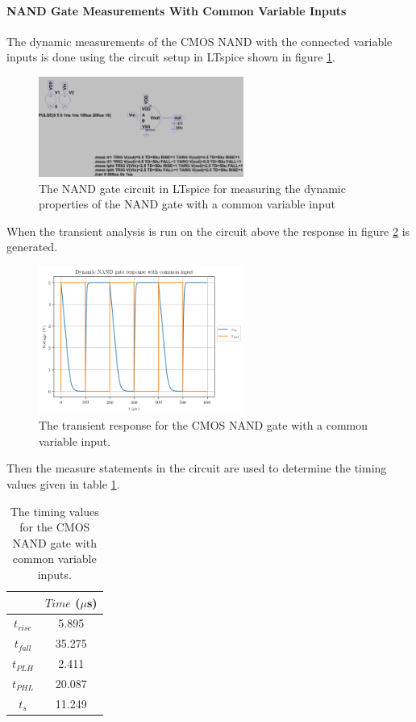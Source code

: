 \documentclass[titlepage, 12pt]{article}
\begin{document}
    \paragraph{NAND Gate Measurements With Common Variable Inputs}

    The dynamic measurements of the CMOS NAND with the connected
    variable inputs is done using the circuit setup in LTspice shown
    in figure \ref{fig:part_22_NAND_AB_circuit}.
    \begin{figure}[H]
        \centering
        \includegraphics[width=0.6\textwidth]
        {figures/part_22_NAND_AB_circuit.png}
        \caption{The NAND gate circuit in LTspice for measuring the
            dynamic properties of the NAND gate with a common variable
        input}
        \label{fig:part_22_NAND_AB_circuit}
    \end{figure}
    When the transient analysis is run on the circuit above the response
    in figure \ref{fig:part_22_NAND_AB} is generated.
    \begin{figure}[H]
        \centering
        \includegraphics[width=0.6\textwidth]{figures/part_22_NAND_AB.png}
        \caption{The transient response for the CMOS NAND gate with a
        common variable input.}
        \label{fig:part_22_NAND_AB}
    \end{figure}
    Then the measure statements in the circuit are used to determine the
    timing values given in table \ref{tab:NAND_AB_time}.
    \begin{table}[H]
        \centering
        \caption{The timing values for the CMOS NAND gate with common
        variable inputs.}
        \label{tab:NAND_AB_time}
        \begin{tabular}{c|c}
            & $Time$ ($\mu$s)\\
            \hline
            $t_{rise}$ & 5.895\\
            $t_{fall}$ & 35.275\\
            $t_{PLH}$ & 2.411\\
            $t_{PHL}$ & 20.087\\
            $t_s$ & 11.249\\
        \end{tabular}
    \end{table}
\end{document}
